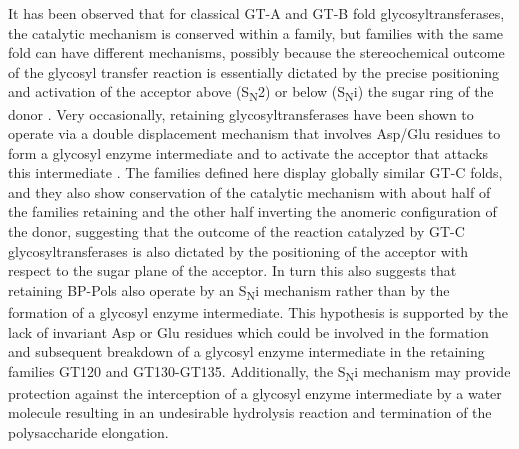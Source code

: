 \documentclass{article}
\begin{document}
It has been observed that for classical GT-A and GT-B fold glycosyltransferases, the catalytic mechanism is conserved within a family, but families with the same fold can have different mechanisms, possibly because the stereochemical outcome of the glycosyl transfer reaction is essentially dictated by the precise positioning and activation of the acceptor above (S\textsubscript{N}2) or below (S\textsubscript{N}i) the sugar ring of the donor \cite{lairson_glycosyltransferases_2008}. Very occasionally, retaining glycosyltransferases have been shown to operate via a double displacement mechanism that involves Asp/Glu residues to form a glycosyl enzyme intermediate and to activate the acceptor that attacks this intermediate \cite{doyle_mechanism_2023}. The families defined here display globally similar GT-C folds, and they also show conservation of the catalytic mechanism with about half of the families retaining and the other half inverting the anomeric configuration of the donor, suggesting that the outcome of the reaction catalyzed by GT-C glycosyltransferases is also dictated by the positioning of the acceptor with respect to the sugar plane of the acceptor. In turn this also suggests that retaining BP-Pols also operate by an S\textsubscript{N}i mechanism rather than by the formation of a glycosyl enzyme intermediate. This hypothesis is supported by the lack of invariant Asp or Glu residues which could be involved in the formation and subsequent breakdown of a glycosyl enzyme intermediate in the retaining families GT120 and GT130-GT135. Additionally, the  S\textsubscript{N}i mechanism may provide protection against the interception of a glycosyl enzyme intermediate by a water molecule resulting in an undesirable hydrolysis reaction and termination of the polysaccharide elongation.
\end{document}
